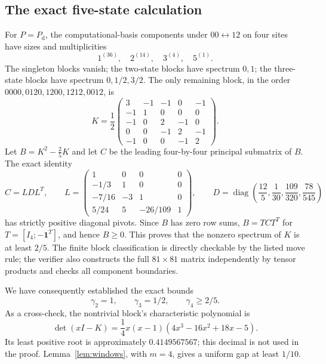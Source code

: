 \documentclass[11pt,a4paper]{article}
\theoremstyle{remark}\newtheorem{remark}[theorem]{Remark}
\newcommand{\diag}{\operatorname{diag}}
\newcommand{\Pd}{P_{\mathrm d}}
\begin{document}
\subsection{The exact five-state calculation}
For $P=\Pd$, the computational-basis components under $00\leftrightarrow12$ on four sites have sizes and multiplicities
\[
 1^{(36)},\quad2^{(14)},\quad3^{(4)},\quad5^{(1)}.
\]
The singleton blocks vanish; the two-state blocks have spectrum $0,1$; the three-state blocks have spectrum $0,1/2,3/2$. The only remaining block, in the order
$0000,0120,1200,1212,0012$, is
\begin{equation}\label{eq:K}
 K=\frac12\begin{pmatrix}
 3&-1&-1&0&-1\\-1&1&0&0&0\\-1&0&2&-1&0\\
 0&0&-1&2&-1\\-1&0&0&-1&2
 \end{pmatrix}.
\end{equation}
Let $B=K^2-\tfrac25K$ and let $C$ be the leading four-by-four principal submatrix of $B$. The exact identity
\begin{equation}\label{eq:LDL}
 C=LDL^T,\qquad
 L=\begin{pmatrix}
 1&0&0&0\\-1/3&1&0&0\\-7/16&-3&1&0\\
 5/24&5&-26/109&1
 \end{pmatrix},\qquad
 D=\diag\left(\frac{12}5,\frac1{30},\frac{109}{320},\frac{78}{545}\right)
\end{equation}
has strictly positive diagonal pivots. Since $B$ has zero row sums,
$B=TCT^T$ for $T=[I_4;-\mathbf1^T]$, and hence $B\ge0$. This proves that the nonzero spectrum of $K$ is at least $2/5$. The finite block classification is directly checkable by the listed move rule; the verifier also constructs the full $81\times81$ matrix independently by tensor products and checks all component boundaries.

We have consequently established the exact bounds
\begin{equation}\label{eq:localbounds}
 \gamma_2=1,\qquad\gamma_3=1/2,\qquad\gamma_4\ge2/5.
\end{equation}
As a cross-check, the nontrivial block's characteristic polynomial is
\[
 \det(xI-K)=\frac14x(x-1)(4x^3-16x^2+18x-5).
\]
Its least positive root is approximately $0.4149567567$; this decimal is not used in the proof. Lemma~\ref{lem:windows}, with $m=4$, gives a uniform gap at least $1/10$.
\end{document}
